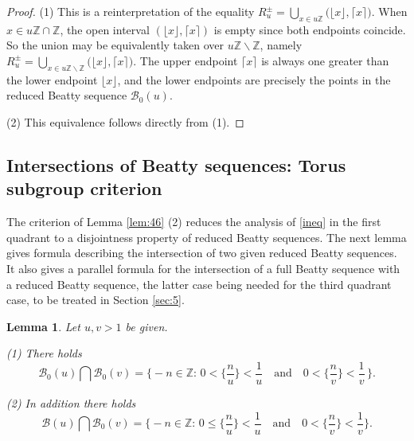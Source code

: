 \documentclass[12pt,letterpaper, reqno]{amsart}
\newtheorem{lem}[thm]{Lemma}
\theoremstyle{definition}
\theoremstyle{remark}
\newcommand{\ZZ}{\ensuremath{\mathbb{Z}}}
\newcommand{\R}{{R}}
\newcommand{\sB}{{\mathcal B}}
\newcommand{\floor}[1]{\lfloor{#1}\rfloor}
\newcommand{\ceil}[1]{\lceil{#1}\rceil}
\begin{document}
\begin{proof} 
(1) This is a reinterpretation of the equality $\R_u^{\pm} = \bigcup_{x\in u\ZZ} \big(\floor{x},\ceil{x} \big).$
When $x\in u\ZZ\cap \ZZ$, the open interval $(\floor x, \ceil x)$ is empty since both endpoints coincide. So the union may be equivalently taken over $u\ZZ\smallsetminus\ZZ$, namely $\R_u^{\pm} = \bigcup_{x\in u\ZZ\smallsetminus\ZZ} \big(\floor{x},\ceil{x} \big)$.
The upper endpoint $\ceil{x}$ is always one greater than the lower endpoint $\floor{x}$, and the lower endpoints are precisely the points in the reduced Beatty sequence $\sB_0(u)$.


(2) This equivalence follows directly from (1).
\end{proof}

%
%
\subsection{Intersections of Beatty sequences:  Torus subgroup criterion}\label{sec:53a}

The  criterion of Lemma \ref{lem:46} (2)  reduces the analysis of \eqref{ineq} in the
first quadrant  to a disjointness property of reduced Beatty sequences. 
 The next lemma gives  formula describing  the intersection of two given reduced Beatty sequences.
 It also gives a parallel formula for the intersection of  a full Beatty sequence with a reduced Beatty sequence, the latter case being
 needed for  the third quadrant case, to be treated in Section \ref{sec:5}.
 
\begin{lem}\label{lem:48}
 Let  $u, v >1$ be given. 
 
 (1) There holds
\begin{equation*}
\sB_0(u) \bigcap \sB_0(v) =  \big\{-n \in \ZZ: \, 0< \{ \frac{n}{u}\} < \frac{1}{u}  \quad \mbox{and} \quad 0 < \{ \frac{n}{v}\} < \frac{1}{v} \, \big\}.
\end{equation*}

(2)  In addition there holds
 \begin{equation*}
\sB(u) \bigcap \sB_0(v) =  \big\{ -n \in \ZZ: \,   0 \le \{  \frac{n}{u}\} < \frac{1}{u}  \quad \mbox{and} \quad 0 < \{ \frac{n}{v}\} < \frac{1}{v} \big\}.
\end{equation*}
 \end{lem}
 
\end{document}
